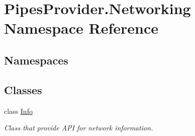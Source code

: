 \hypertarget{namespace_pipes_provider_1_1_networking}{}\section{Pipes\+Provider.\+Networking Namespace Reference}
\label{namespace_pipes_provider_1_1_networking}
\subsection*{Namespaces}
\begin{DoxyCompactItemize}
\end{DoxyCompactItemize}
\subsection*{Classes}
\begin{DoxyCompactItemize}
\item 
class \mbox{\hyperlink{class_pipes_provider_1_1_networking_1_1_info}{Info}}
\begin{DoxyCompactList}\small\item\em Class that provide A\+PI for network information. \end{DoxyCompactList}\end{DoxyCompactItemize}
